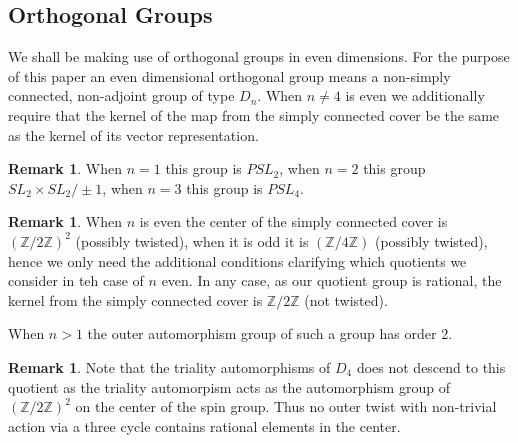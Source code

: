 \documentclass{article}
\theoremstyle{plain}
\theoremstyle{definition}
\newtheorem{remark}[theorem]{Remark}
\newcommand{\ZZ}{\mathbb{Z}}
\begin{document}
\subsection{Orthogonal Groups}

We shall be making use of orthogonal groups in even dimensions.
For the purpose of this paper an even dimensional orthogonal group means a non-simply connected, non-adjoint group of type $D_n$. When $n\neq 4$ is even we additionally require that the kernel of the map from the simply connected cover be the same as the kernel of its vector representation.

\begin{remark}
When $n=1$ this group is $PSL_2$, when $n=2$ this group $SL_2\times SL_2/\pm1$, when $n=3$ this group is $PSL_4$.
\end{remark}

\begin{remark}
When $n$ is even the center of the simply connected cover is $(\ZZ/2\ZZ)^2$ (possibly twisted), when it is odd it is $(\ZZ/4\ZZ)$ (possibly twisted), hence we only need the additional conditions clarifying which quotients we consider in teh case of $n$ even.
In any case, as our quotient group is rational, the kernel from the simply connected cover is $\ZZ/2\ZZ$ (not twisted).
\end{remark}

When $n>1$ the outer automorphism group of such a group has order $2$.
\begin{remark}
Note that the triality automorphisms of $D_4$ does not descend to this quotient as the triality automorpism acts as the automorphism group of $(\ZZ/2\ZZ)^2$ on the center of the spin group. Thus no outer twist with non-trivial action via a three cycle contains rational elements in the center.
\end{remark}
\end{document}
